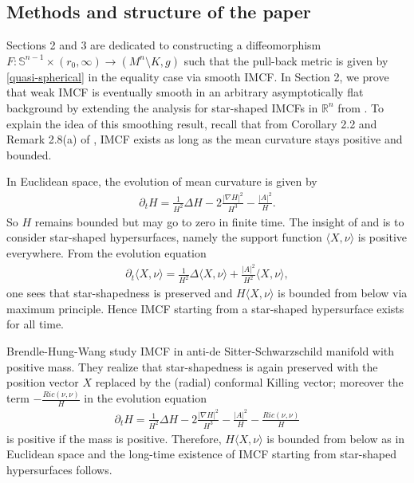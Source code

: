 \documentclass[12pt,twoside]{article}
\theoremstyle{plain}
\theoremstyle{definition}
\theoremstyle{remark}
\newcommand{\pl}{\partial}
\newcommand{\na}{\nabla}
\numberwithin{equation}{section}
\begin{document}
\subsection{Methods and structure of the paper}
Sections 2 and 3 are dedicated to constructing a diffeomorphism $F: \mathbb{S}^{n-1} \times (r_{0},\infty) \rightarrow (M^{n} \setminus K, g)$ such that the pull-back metric is given by \eqref{quasi-spherical} in the equality case via smooth IMCF. In Section 2, we prove that weak IMCF is eventually smooth in an arbitrary asymptotically flat background by extending the analysis for star-shaped IMCFs in $\mathbb{R}^{n}$ from \cite{HI2}. To explain the idea of this smoothing result, recall that from Corollary 2.2 and Remark 2.8(a) of \cite{HI2},
IMCF exists as long as the mean curvature stays positive and bounded. 

In Euclidean space, the evolution of mean curvature is given by
\begin{align*}
\pl_t H = \frac{1}{H^2}\Delta H - 2 \frac{|\na H|^2}{H^3} - \frac{|A|^2}{H}.
\end{align*}
So $H$ remains bounded but may go to zero in finite time. The insight of \cite{imcf_starshaped} and \cite{Ur} is to consider star-shaped hypersurfaces, namely the support function $\langle X,\nu \rangle$ is positive everywhere. From the evolution equation 
\begin{align}\label{support}
\pl_t \langle X,\nu \rangle = \frac{1}{H^2}\Delta \langle X,\nu \rangle + \frac{|A|^2}{H^2} \langle X,\nu \rangle,
\end{align} 
one sees that star-shapedness is preserved and $H \langle X,\nu \rangle$ is bounded from below via maximum principle. Hence IMCF starting from a star-shaped hypersurface exists for all time. 

Brendle-Hung-Wang \cite{BHW} study IMCF in anti-de Sitter-Schwarzschild manifold with positive mass. They realize that star-shapedness is again preserved with the position vector $X$ replaced by the (radial) conformal Killing vector; moreover the term $-\frac{Ric(\nu,\nu)}{H}$ in the evolution equation
\begin{align*}
\pl_t H = \frac{1}{H^2}\Delta H - 2 \frac{|\na H|^2}{H^3} - \frac{|A|^2}{H} - \frac{Ric(\nu,\nu)}{H} 
\end{align*}
is positive if the mass is positive. Therefore, $H \langle X,\nu \rangle$ is bounded from below as in Euclidean space and the long-time existence of IMCF starting from star-shaped hypersurfaces follows.
\end{document}
